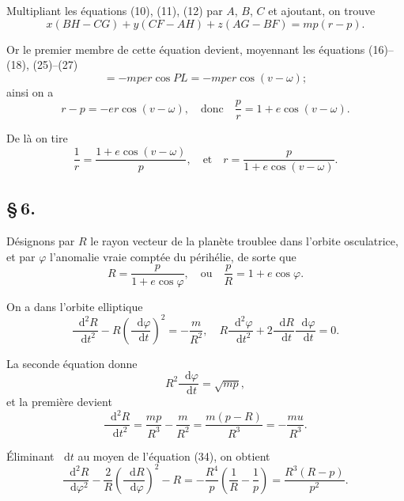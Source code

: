 \documentclass[12pt,a4paper]{article}
\newcommand{\dd}{\mathop{}\!\mathrm{d}}
\begin{document}
Multipliant les \'{e}quations (10), (11), (12) par $A$, $B$, $C$ et ajoutant, on trouve
\[
x(BH - CG) + y(CF - AH) + z(AG - BF) = mp(r - p).
\]

Or le premier membre de cette \'{e}quation devient, moyennant les \'{e}quations (16)--(18), (25)--(27)
\[
= -mper\cos PL = -mper\cos(v - \omega);
\]
ainsi on a
\begin{equation}
r - p = -er\cos(v - \omega), \quad \text{donc} \quad \frac{p}{r} = 1 + e\cos(v - \omega). \tag{31}
\end{equation}

De l\`{a} on tire
\begin{equation}
\frac{1}{r} = \frac{1 + e\cos(v - \omega)}{p}, \quad \text{et} \quad r = \frac{p}{1 + e\cos(v - \omega)}. \tag{32}
\end{equation}

\newpage
\subsection*{\S\,6.}

D\'{e}signons par $R$ le rayon vecteur de la plan\`{e}te troublee dans l'orbite osculatrice, et par $\varphi$ l'anomalie vraie compt\'{e}e du p\'{e}rih\'{e}lie, de sorte que
\[
R = \frac{p}{1 + e\cos\varphi}, \quad \text{ou} \quad \frac{p}{R} = 1 + e\cos\varphi.
\]

On a dans l'orbite elliptique
\begin{equation}
\frac{\dd^2 R}{\dd t^2} - R\left(\frac{\dd\varphi}{\dd t}\right)^2 = -\frac{m}{R^2}, \quad R\frac{\dd^2\varphi}{\dd t^2} + 2\frac{\dd R}{\dd t}\frac{\dd\varphi}{\dd t} = 0. \tag{33}
\end{equation}

La seconde \'{e}quation donne
\begin{equation}
R^2\frac{\dd\varphi}{\dd t} = \sqrt{mp}, \tag{34}
\end{equation}
et la premi\`{e}re devient
\begin{equation}
\frac{\dd^2 R}{\dd t^2} = \frac{mp}{R^3} - \frac{m}{R^2} = \frac{m(p - R)}{R^3} = -\frac{mu}{R^3}. \tag{35}
\end{equation}

\'{E}liminant $\dd t$ au moyen de l'\'{e}quation (34), on obtient
\begin{equation}
\frac{\dd^2 R}{\dd\varphi^2} - \frac{2}{R}\left(\frac{\dd R}{\dd\varphi}\right)^2 - R = -\frac{R^4}{p}\left(\frac{1}{R} - \frac{1}{p}\right) = \frac{R^3(R-p)}{p^2}. \tag{36}
\end{equation}
\end{document}
